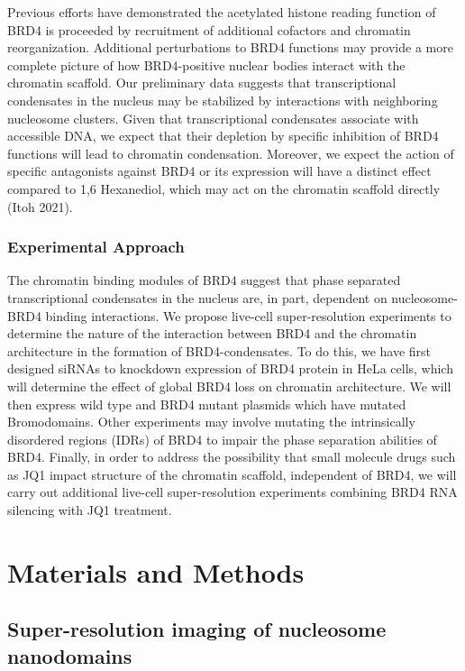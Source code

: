 \documentclass{ucetd}
\begin{document}
Previous efforts have demonstrated the acetylated histone reading function of BRD4 is proceeded by recruitment of additional cofactors and chromatin reorganization. Additional perturbations to BRD4 functions may provide a more complete picture of how BRD4-positive nuclear bodies interact with the chromatin scaffold. Our preliminary data suggests that transcriptional condensates in the nucleus may be stabilized by interactions with neighboring nucleosome clusters. Given that transcriptional condensates associate with accessible DNA, we expect that their depletion by specific inhibition of BRD4 functions will lead to chromatin condensation. Moreover, we expect the action of specific antagonists against BRD4 or its expression will have a distinct effect compared to 1,6 Hexanediol, which may act on the chromatin scaffold directly (Itoh 2021). 


\subsubsection{Experimental Approach}

The chromatin binding modules of BRD4 suggest that phase separated transcriptional condensates in the nucleus are, in part, dependent on nucleosome-BRD4 binding interactions. We propose live-cell super-resolution experiments to determine the nature of the interaction between BRD4 and the chromatin architecture in the formation of BRD4-condensates. To do this, we have first designed siRNAs to knockdown expression of BRD4 protein in HeLa cells, which will determine the effect of global BRD4 loss on chromatin architecture. We will then express wild type and BRD4 mutant plasmids which have mutated Bromodomains. Other experiments may involve mutating the intrinsically disordered regions (IDRs) of BRD4 to impair the phase separation abilities of BRD4. Finally, in order to address the possibility that small molecule drugs such as JQ1 impact structure of the chromatin scaffold, independent of BRD4, we will carry out additional live-cell super-resolution experiments combining BRD4 RNA silencing with JQ1 treatment.

\section{Materials and Methods}

\subsection{Super-resolution imaging of nucleosome nanodomains}
\end{document}
